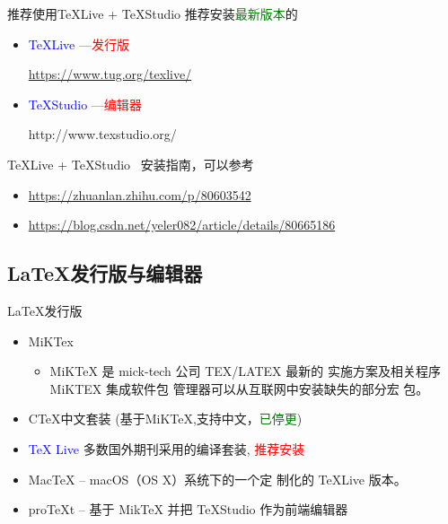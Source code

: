 \documentclass[13pt]{ctexbeamer}
\newcommand{\red}[1]{\textcolor{red}{#1}}
\newcommand{\blue}[1]{\textcolor{blue}{#1}}
\newcommand{\green}[1]{\textcolor{green}{#1}}
\begin{document}
    \begin{frame}{推荐使用TeXLive + TeXStudio }
    	推荐安装\green{最新版本}的

    	\begin{itemize}
    		\item \blue{TeXLive}  ---\red{发行版}

    		\href{https://www.tug.org/texlive/}{https://www.tug.org/texlive/}



    		\item \blue{TeXStudio}    ---\red{编辑器}

    		http://www.texstudio.org/
    	\end{itemize}

    	{TeXLive} + {TeXStudio}   ~安装指南，可以参考
    	\begin{itemize}
    		\item 	\href{https://zhuanlan.zhihu.com/p/80603542}{https://zhuanlan.zhihu.com/p/80603542}
    		\item \href{https://blog.csdn.net/yeler082/article/details/80665186}{https://blog.csdn.net/yeler082/article/details/80665186}
    	\end{itemize}
    \end{frame}

\subsection{LaTeX发行版与编辑器}
\begin{frame}{LaTeX发行版}
\begin{itemize}
	\item MiKTex
		\begin{itemize}
	\item
	MiKTeX 是 mick-tech 公司 TEX/LATEX 最新的
实施方案及相关程序 MiKTEX 集成软件包
管理器可以从互联网中安装缺失的部分宏
包。
\end{itemize}
	\item CTeX中文套装 (基于MiKTeX,支持中文，\green{已停更})

	\item \blue{TeX Live}   多数国外期刊采用的编译套装, \red{推荐安装}


	\item MacTeX -- macOS（OS X）系统下的一个定
制化的 TeXLive 版本。

\item proTeXt -- 基于 MikTeX 并把 TeXStudio 作为前端编辑器
\end{itemize}
\end{frame}
\end{document}
